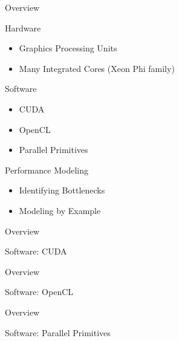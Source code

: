 

\begin{frame}{Overview}

 \begin{block}{Hardware}
  \begin{itemize}
   \item Graphics Processing Units
   \item Many Integrated Cores (Xeon Phi family)
  \end{itemize}
 \end{block}

 \begin{block}{Software}
  \begin{itemize}
   \item CUDA
   \item OpenCL
   \item Parallel Primitives
  \end{itemize}
 \end{block}

 \begin{block}{Performance Modeling}
  \begin{itemize}
   \item Identifying Bottlenecks
   \item Modeling by Example
  \end{itemize}
 \end{block}


\end{frame}








\begin{frame}{Overview} \begin{center} \Large Software: CUDA \end{center} \end{frame}

\begin{frame}{Overview} \begin{center} \Large Software: OpenCL \end{center} \end{frame}

\begin{frame}{Overview} \begin{center} \Large Software: Parallel Primitives \end{center} \end{frame}





